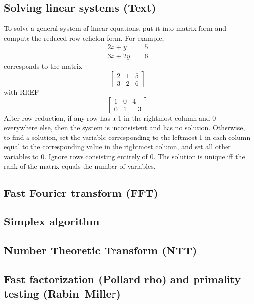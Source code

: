 \documentclass[9pt]{extarticle}
\begin{document}
\begin{multicols*}{3}
\subsection{Solving linear systems (Text)} %
To solve a general system of linear equations, put it into matrix form and
compute the reduced row echelon form. For example,
\begin{align*}2x + y &= 5 \\ 3x + 2y &= 6\end{align*}
corresponds to the matrix
\[ \left[ \begin{array}{cc|c} 2 & 1 & 5 \\ 3 & 2 & 6 \end{array} \right] \]
with RREF
\[ \left[ \begin{array}{cc|c} 1 & 0 & 4 \\ 0 & 1 & -3 \end{array} \right] \]
After row reduction, if any row has a 1 in the rightmost column and 0
everywhere else, then the system is inconsistent and has no solution.
Otherwise, to find a solution, set the variable corresponding to the leftmost 1
in each column equal to the corresponding value in the rightmost column, and
set all other variables to 0. Ignore rows consisting entirely of 0. The
solution is unique iff the rank of the matrix equals the number of variables.

\subsection{Fast Fourier transform (FFT)} %


\subsection{Simplex algorithm} %


\subsection{Number Theoretic Transform (NTT)}


\subsection{Fast factorization (Pollard rho) and primality testing
(Rabin--Miller)} %



\end{multicols*}
\end{document}
